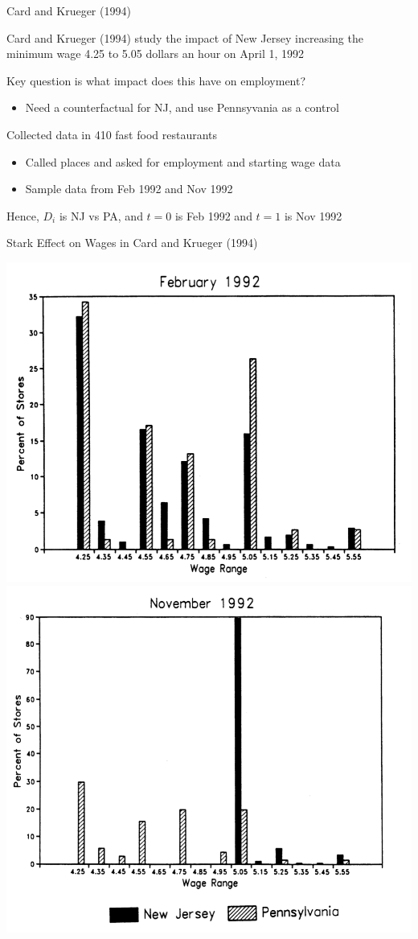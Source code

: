 \documentclass[notes,11pt, aspectratio=169]{beamer}
\newenvironment{wideitemize}{\itemize\addtolength{\itemsep}{10pt}}{\enditemize}
\begin{document}
\begin{frame}{Card and Krueger (1994)}
  \begin{wideitemize}
  \item Card and Krueger (1994) study the impact of New Jersey
    increasing the minimum wage 4.25 to 5.05 dollars an hour on April
    1, 1992
  \item Key question is what impact does this have on employment?
    \begin{itemize}
    \item Need a counterfactual for NJ, and use Pennsyvania as a control
    \end{itemize}
  \item Collected data in 410 fast food restaurants
    \begin{itemize}
    \item Called places and asked for employment and starting wage data
    \item Sample data from Feb 1992 and Nov 1992
    \end{itemize}
  \item Hence, $D_{i}$ is NJ vs PA, and $t=0$ is Feb 1992 and $t = 1$ is Nov 1992
  \end{wideitemize}
\end{frame}

\begin{frame}{Stark Effect on Wages in Card and Krueger (1994) }
  \begin{center}
    \includegraphics[width=0.45\linewidth]{images/cardkrueger1.png}   \includegraphics[width=0.45\linewidth]{images/cardkrueger2.png}
    \end{center}
\end{frame}
\end{document}
